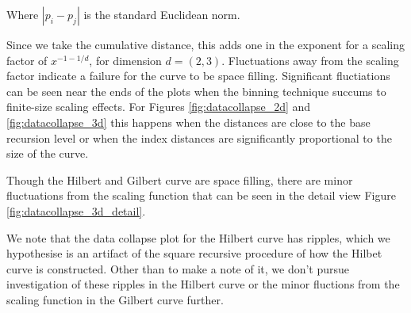 Where $|p_i - p_j|$ is the standard Euclidean norm.

Since we take the cumulative distance, this adds one in the exponent for a scaling factor of $x^{-1-1/d}$,
for dimension $d = (2,3)$.
Fluctuations away from the scaling factor indicate a failure for the curve to be space filling.
Significant fluctiations can be seen near the ends of the plots when the binning technique
succums to finite-size scaling effects.
For Figures \ref{fig:datacollapse_2d} and \ref{fig:datacollapse_3d} this happens when the distances
are close to the base recursion level or when the index distances are significantly proportional to
the size of the curve.

Though the Hilbert and Gilbert curve are space filling, there are minor fluctuations from the scaling
function that can be seen in the detail view Figure \ref{fig:datacollapse_3d_detail}.

We note that the data collapse plot for the Hilbert curve has ripples, which
we hypothesise is an artifact of the square recursive procedure of how
the Hilbet curve is constructed.
Other than to make a note of it, we don't pursue investigation of these ripples in the Hilbert curve
or the minor fluctions from the scaling function in the Gilbert curve further.


